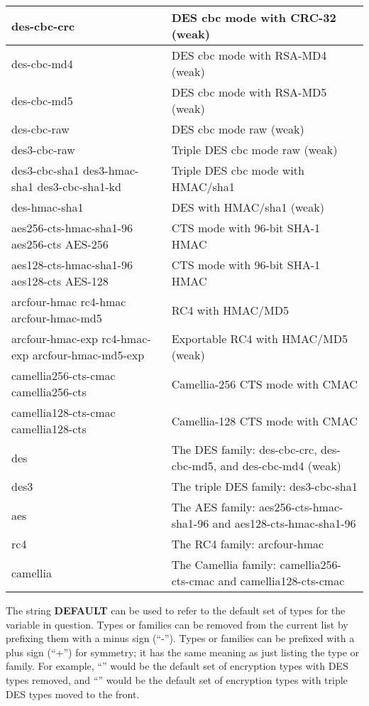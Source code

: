 \documentclass[letterpaper,10pt,english]{sphinxmanual}
\begin{document}
\begin{tabulary}{\linewidth}{|L|L|}
\hline

des-cbc-crc
 & 
DES cbc mode with CRC-32 (weak)
\\
\hline
des-cbc-md4
 & 
DES cbc mode with RSA-MD4 (weak)
\\
\hline
des-cbc-md5
 & 
DES cbc mode with RSA-MD5 (weak)
\\
\hline
des-cbc-raw
 & 
DES cbc mode raw (weak)
\\
\hline
des3-cbc-raw
 & 
Triple DES cbc mode raw (weak)
\\
\hline
des3-cbc-sha1 des3-hmac-sha1 des3-cbc-sha1-kd
 & 
Triple DES cbc mode with HMAC/sha1
\\
\hline
des-hmac-sha1
 & 
DES with HMAC/sha1 (weak)
\\
\hline
aes256-cts-hmac-sha1-96 aes256-cts AES-256
 & 
CTS mode with 96-bit SHA-1 HMAC
\\
\hline
aes128-cts-hmac-sha1-96 aes128-cts AES-128
 & 
CTS mode with 96-bit SHA-1 HMAC
\\
\hline
arcfour-hmac rc4-hmac arcfour-hmac-md5
 & 
RC4 with HMAC/MD5
\\
\hline
arcfour-hmac-exp rc4-hmac-exp arcfour-hmac-md5-exp
 & 
Exportable RC4 with HMAC/MD5 (weak)
\\
\hline
camellia256-cts-cmac camellia256-cts
 & 
Camellia-256 CTS mode with CMAC
\\
\hline
camellia128-cts-cmac camellia128-cts
 & 
Camellia-128 CTS mode with CMAC
\\
\hline
des
 & 
The DES family: des-cbc-crc, des-cbc-md5, and des-cbc-md4 (weak)
\\
\hline
des3
 & 
The triple DES family: des3-cbc-sha1
\\
\hline
aes
 & 
The AES family: aes256-cts-hmac-sha1-96 and aes128-cts-hmac-sha1-96
\\
\hline
rc4
 & 
The RC4 family: arcfour-hmac
\\
\hline
camellia
 & 
The Camellia family: camellia256-cts-cmac and camellia128-cts-cmac
\\
\hline\end{tabulary}


The string \textbf{DEFAULT} can be used to refer to the default set of
types for the variable in question.  Types or families can be removed
from the current list by prefixing them with a minus sign (``-'').
Types or families can be prefixed with a plus sign (``+'') for symmetry;
it has the same meaning as just listing the type or family.  For
example, ``'' would be the default set of encryption
types with DES types removed, and ``'' would be the
default set of encryption types with triple DES types moved to the
front.
\end{document}
